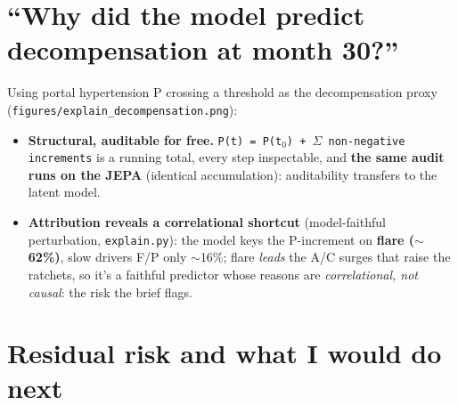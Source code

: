 \section{``Why did the model predict decompensation at month 30?''}

Using portal hypertension P crossing a threshold as the decompensation proxy
(\texttt{figures/explain\_decompensation.png}):

\begin{itemize}
\item \textbf{Structural, auditable for free.} \texttt{P(t) = P(t$_0$) + $\Sigma$ non-negative increments}
is a running total, every step inspectable, and \textbf{the same audit runs on the JEPA} (identical
accumulation): auditability transfers to the latent model.
\item \textbf{Attribution reveals a correlational shortcut} (model-faithful perturbation,
\texttt{explain.py}): the model keys the P-increment on \textbf{flare ($\sim$62\%)}, slow drivers F/P only
$\sim$16\%; flare \textit{leads} the A/C surges that raise the ratchets, so it's a faithful predictor
whose reasons are \textit{correlational, not causal}: the risk the brief flags.
\end{itemize}

\section{Residual risk and what I would do next}

